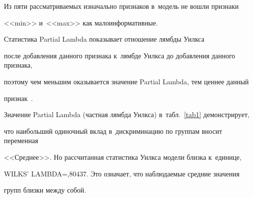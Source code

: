Из пяти рассматриваемых изначально признаков в~модель не вошли признаки 

<<min>> и~<<max>> как малоинформативные.



Статистика Partial Lambda показывает отношение лямбды Уилкса 

после добавления данного признака к~лямбде Уилкса до добавления данного признака, 

поэтому чем меньшим оказывается значение Partial Lambda, тем ценнее данный 

признак~\cite{dubrov}.



Значение Partial Lambda (частная лямбда Уилкса) в~табл.~\ref{tab1} демонстрирует, 

что наибольший одиночный вклад в~дискриминацию по группам вносит переменная 

<<Среднее>>. Но рассчитанная статистика Уилкса модели близка к~единице, 

WILKS' LAMBDA\;=,80437. Это означает, что наблюдаемые средние значения 

групп близки между собой.



